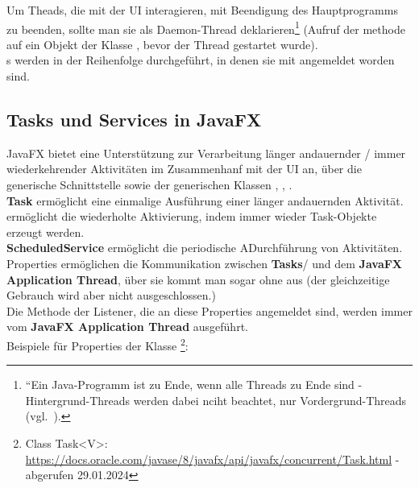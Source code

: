 \noindent
Um Theads, die mit der UI interagieren, mit Beendigung des Hauptprogramms zu beenden, sollte man sie als Daemon-Thread deklarieren\footnote{
``Ein Java-Programm ist zu Ende, wenn alle Threads zu Ende sind - Hintergrund-Threads werden dabei nciht beachtet, nur Vordergrund-Threads (vgl.~\cite[89]{Oec22}).
} (Aufruf der methode  auf ein Objekt der Klasse , bevor der Thread gestartet wurde).\\

\noindent
{}s werden in der Reihenfolge durchgeführt, in denen sie mit  angemeldet worden sind.

\subsection{Tasks und Services in JavaFX}

JavaFX bietet eine Unterstützung zur Verarbeitung länger andauernder / immer wiederkehrender Aktivitäten im Zusammenhanf mit der UI an, über die generische Schnittstelle  sowie der generischen Klassen , , .\\

\noindent
\textbf{Task} ermöglicht eine einmalige Ausführung einer länger andauernden Aktivität.\\

\noindent
{} ermöglicht die wiederholte Aktivierung, indem immer wieder Task-Objekte erzeugt werden.\\

\noindent
\textbf{ScheduledService} ermöglicht die periodische ADurchführung von Aktivitäten.\\

\noindent
Properties ermöglichen die Kommunikation zwischen \textbf{Tasks}/ und dem \textbf{JavaFX Application Thread}, über sie kommt man sogar ohne  aus (der gleichzeitige Gebrauch wird aber nicht ausgeschlossen.)\\

\noindent
Die Methode der Listener, die an diese Properties angemeldet sind, werden immer vom \textbf{JavaFX Application Thread} ausgeführt.\\

\noindent
Beispiele für Properties der Klasse \footnote{
Class Task<V>: \url{https://docs.oracle.com/javase/8/javafx/api/javafx/concurrent/Task.html} - abgerufen 29.01.2024
}:

